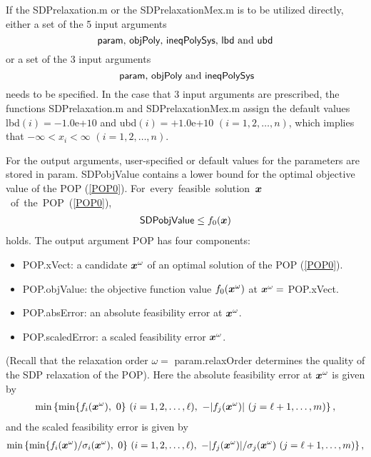 If the SDPrelaxation.m or the SDPrelaxationMex.m is to be utilized directly,
 either a set of the 5 input arguments 
\[
\mbox{ {\sf param}, {\sf objPoly}, {\sf ineqPolySys}, {\sf lbd} and {\sf ubd} } 
\]
or a set of the 3 input arguments 
\[
\mbox{ {\sf param}, {\sf objPoly} and {\sf ineqPolySys}} 
\]
needs to be specified. %
In the case that 3 input arguments are prescribed,
the functions SDPrelaxation.m and SDPrelaxationMex.m assign the default values 
{\sf lbd}$(i) = -1.0$e+$10$ and  {\sf ubd}$(i) = +1.0$e+$10$ $(i=1,2,\ldots,n)$, which implies that 
$-\infty < x_i < \infty$ $(i=1,2,\ldots,n)$.  

For the output arguments, user-specified or default values for the parameters are stored  in {\sf param}.
{\sf SDPobjValue} contains a lower bound for the optimal objective value of the POP (\ref{POP0}). 
\mbox{For every feasible solution $\x$ of the POP (\ref{POP0})},
\begin{eqnarray}
\mbox{{\sf SDPobjValue}}  \leq f_0(\x) \label{lowerBound} 
\end{eqnarray}
holds. %
The output argument {\sf POP} has four components: 
\begin{itemize}
\item {\sf POP.xVect}: a candidate $\x^{\omega}$ of an optimal solution of  the POP (\ref{POP0}). 
\item {\sf POP.objValue}: 
the objective function value $f_0(\x^{\omega})$ at $\x^{\omega} = $ {\sf POP.xVect}.
\item {\sf POP.absError}: an  absolute feasibility error at  $\x^{\omega}$. 
\item {\sf POP.scaledError}: a scaled feasibility error $\x^{\omega}$. 
\end{itemize}
(Recall that the relaxation order $\omega = $ {\sf param.relaxOrder} determines the 
quality of the SDP relaxation of the POP). %
Here the absolute feasibility error 
at $\x^{\omega}$ is given by 
\begin{eqnarray*}
\min \left\{ \min\{ f_i(\x^{\omega}), \ 0 \} \ (i=1,2,\ldots,\ell), \ - |f_j(\x^{\omega})| \ (j=\ell+1,\ldots,m) \right\}, 
\end{eqnarray*}
and the scaled feasibility error  
is given by 
\begin{eqnarray*}
\min \left\{ \min\{ f_i(\x^{\omega})/\sigma_i(\x^{\omega}), \ 0 \} \ (i=1,2,\ldots,\ell), \ - |f_j(\x^{\omega})|/\sigma_j(\x^{\omega}) \ (j=\ell+1,\ldots,m) \right\}, 
\end{eqnarray*}
